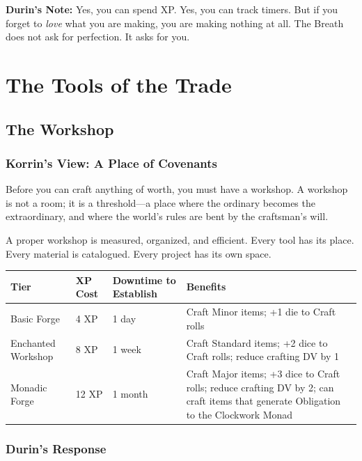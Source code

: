 \documentclass[11pt]{book}
\begin{document}
\vspace{0.5cm}
\textbf{Durin's Note:} Yes, you can spend XP. Yes, you can track timers. But if you forget to \textit{love} what you are making, you are making nothing at all. The Breath does not ask for perfection. It asks for you.

\newpage
\chapter{The Tools of the Trade}

\section{The Workshop}

\subsection*{Korrin's View: A Place of Covenants}

Before you can craft anything of worth, you must have a workshop. A workshop is not a room; it is a threshold---a place where the ordinary becomes the extraordinary, and where the world's rules are bent by the craftsman's will.

A proper workshop is measured, organized, and efficient. Every tool has its place. Every material is catalogued. Every project has its own space.

\begin{table}[h]
\centering
\begin{tabular}{@{}llll@{}}
\toprule
\textbf{Tier} & \textbf{XP Cost} & \textbf{Downtime to Establish} & \textbf{Benefits} \\
\midrule
Basic Forge & 4 XP & 1 day & Craft Minor items; +1 die to Craft rolls \\
Enchanted Workshop & 8 XP & 1 week & Craft Standard items; +2 dice to Craft rolls; reduce crafting DV by 1 \\
Monadic Forge & 12 XP & 1 month & Craft Major items; +3 dice to Craft rolls; reduce crafting DV by 2; can craft items that generate Obligation to the Clockwork Monad \\
\bottomrule
\end{tabular}
\end{table}

\subsection*{Durin's Response}
\end{document}
